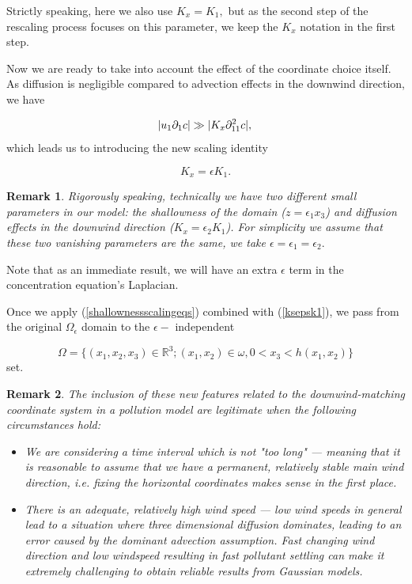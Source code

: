 \documentclass[11pt, a4paper]{article}
\newtheorem{remark}{Remark}
\begin{document}
Strictly speaking, here we also use $K_x = K_1,$ but as the second step of the rescaling process focuses on this parameter, we keep the $K_x$ notation in the first step.

Now we are ready to take into account the effect of the coordinate choice itself. As diffusion is negligible compared to advection effects in the downwind direction, we have

\begin{equation} \abs{u_1 \partial_{1} c} \gg | K_x \partial_{11} ^2 c | ,\end{equation}
%
which leads us to introducing the new scaling identity

\begin{equation} \label{ksepsk1} K_x = \epsilon K_1. \end{equation}

\begin{remark}
Rigorously speaking, technically we have two different small parameters in our model: the shallowness of the domain ($z = \epsilon_1 x_3$) and diffusion effects in the downwind direction ($K_x = \epsilon_2 K_1$). For simplicity we assume that these two vanishing parameters are the same, we take $\epsilon = \epsilon_1 = \epsilon_2.$
\end{remark}

Note that as an immediate result, we will have an extra $\epsilon$ term in the concentration equation's Laplacian.

Once we apply (\ref{shallownessscalingeqs}) combined with (\ref{ksepsk1}), we pass from the original $\Omega_\epsilon$ domain to the $\epsilon-$ independent

\begin{equation} \Omega = \{(x_1,x_2,x_3) \in \mathbb{R}^3 ; (x_1,x_2) \in \omega, 0 < x_3 < h (x_1 , x_2) \} \end{equation}
%
set.

\begin{remark} \normalfont
The inclusion of these new features related to the downwind-matching coordinate system in a pollution model are legitimate when the following circumstances hold:
\begin{itemize}
\item We are considering a time interval which is not "too long" --- meaning that it is reasonable to assume that we have a permanent, relatively stable main wind direction, i.e. fixing the horizontal coordinates makes sense in the first place.
\item There is an adequate, relatively high wind speed --- low wind speeds in general lead to a situation where three dimensional diffusion dominates, leading to an error caused by the dominant advection assumption. Fast changing wind direction and low windspeed resulting in fast pollutant settling can make it extremely challenging to obtain reliable results from Gaussian models.
\end{itemize}
\end{remark}
\end{document}

